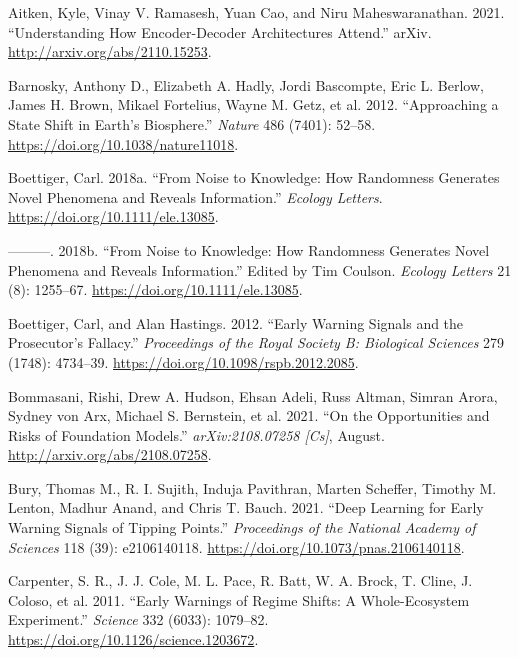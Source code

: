 \documentclass{article}
\newlength{\cslhangindent}
\newlength{\cslentryspacingunit} %
\newenvironment{CSLReferences}[2] %
 {%
  \setlength{\parindent}{0pt}
  \ifodd #1
  \let\oldpar\par
  \def\par{\hangindent=\cslhangindent\oldpar}
  \fi
  \setlength{\parskip}{#2\cslentryspacingunit}
 }%
 {}
\begin{document}
\hypertarget{refs}{}
\begin{CSLReferences}{1}{0}
\leavevmode{}%
Aitken, Kyle, Vinay V. Ramasesh, Yuan Cao, and Niru Maheswaranathan.
2021. {``Understanding {How} {Encoder}-{Decoder} {Architectures}
{Attend}.''} arXiv. \url{http://arxiv.org/abs/2110.15253}.

\leavevmode{}%
Barnosky, Anthony D., Elizabeth A. Hadly, Jordi Bascompte, Eric L.
Berlow, James H. Brown, Mikael Fortelius, Wayne M. Getz, et al. 2012.
{``Approaching a State Shift in {Earth}'s Biosphere.''} \emph{Nature}
486 (7401): 52--58. \url{https://doi.org/10.1038/nature11018}.

\leavevmode{}%
Boettiger, Carl. 2018a. {``From Noise to Knowledge: How Randomness
Generates Novel Phenomena and Reveals Information.''} \emph{Ecology
Letters}. \url{https://doi.org/10.1111/ele.13085}.

\leavevmode{}%
---------. 2018b. {``From Noise to Knowledge: How Randomness Generates
Novel Phenomena and Reveals Information.''} Edited by Tim Coulson.
\emph{Ecology Letters} 21 (8): 1255--67.
\url{https://doi.org/10.1111/ele.13085}.

\leavevmode{}%
Boettiger, Carl, and Alan Hastings. 2012. {``Early Warning Signals and
the Prosecutor's Fallacy.''} \emph{Proceedings of the Royal Society B:
Biological Sciences} 279 (1748): 4734--39.
\url{https://doi.org/10.1098/rspb.2012.2085}.

\leavevmode{}%
Bommasani, Rishi, Drew A. Hudson, Ehsan Adeli, Russ Altman, Simran
Arora, Sydney von Arx, Michael S. Bernstein, et al. 2021. {``On the
{Opportunities} and {Risks} of {Foundation} {Models}.''}
\emph{arXiv:2108.07258 {[}Cs{]}}, August.
\url{http://arxiv.org/abs/2108.07258}.

\leavevmode{}%
Bury, Thomas M., R. I. Sujith, Induja Pavithran, Marten Scheffer,
Timothy M. Lenton, Madhur Anand, and Chris T. Bauch. 2021. {``Deep
Learning for Early Warning Signals of Tipping Points.''}
\emph{Proceedings of the National Academy of Sciences} 118 (39):
e2106140118. \url{https://doi.org/10.1073/pnas.2106140118}.

\leavevmode{}%
Carpenter, S. R., J. J. Cole, M. L. Pace, R. Batt, W. A. Brock, T.
Cline, J. Coloso, et al. 2011. {``Early {Warnings} of {Regime} {Shifts}:
{A} {Whole}-{Ecosystem} {Experiment}.''} \emph{Science} 332 (6033):
1079--82. \url{https://doi.org/10.1126/science.1203672}.


\end{CSLReferences}
\end{document}
